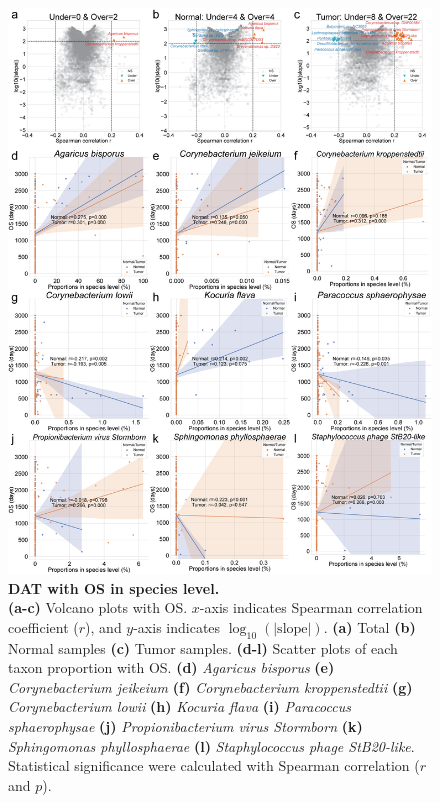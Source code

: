 \documentclass[11pt, a4paper, onecolumn, oneside]{report}
\begin{document}
            \begin{figure}[p]
                \centering
                \includegraphics[width=0.8 \linewidth]{Figures/CRC/Figure_09.png}
                \caption[DAT with OS in species level]{\textbf{DAT with OS in species level.}\\
                    \textbf{(a-c)} Volcano plots with OS. $x$-axis indicates Spearman correlation coefficient ($r$), and $y$-axis indicates $\log_{10} (| \textrm{slope} |)$. \textbf{(a)} Total \textbf{(b)} Normal samples \textbf{(c)} Tumor samples. \textbf{(d-l)} Scatter plots of each taxon proportion with OS. \textbf{(d)} \textit{Agaricus bisporus} \textbf{(e)} \textit{Corynebacterium jeikeium} \textbf{(f)} \textit{Corynebacterium kroppenstedtii} \textbf{(g)} \textit{Corynebacterium lowii} \textbf{(h)} \textit{Kocuria flava} \textbf{(i)} \textit{Paracoccus sphaerophysae} \textbf{(j)} \textit{Propionibacterium virus Stormborn} \textbf{(k)} \textit{Sphingomonas phyllosphaerae} \textbf{(l)} \textit{Staphylococcus phage StB20-like}. Statistical significance were calculated with Spearman correlation ($r$ and $p$).}
                \label{fig:CRC-DAT-OS}
            \end{figure}
            \clearpage
\end{document}
